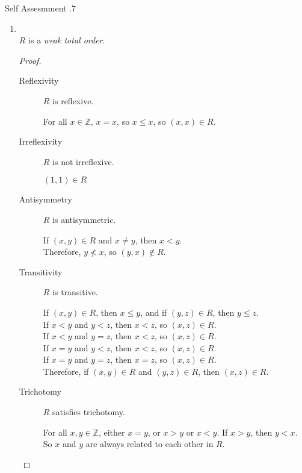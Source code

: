 \documentclass[../notes.tex]{subfiles}
\begin{document}
\begin{exercise}{Self Assesmment \thechapter.7}
\begin{enumerate}
						\item {}\\
							$R$ is a \emph{weak total order}.
							\begin{proof}
								$ $
								\begin{description}
									\item[Reflexivity] $R$ is reflexive.
										\begin{subproof}
											For all $x \in \mathbb{Z}$, $x = x$, so $x \leq x$, so $(x, x) \in R$.
										\end{subproof}
									\item[Irreflexivity] $R$ is not irreflexive.
										\begin{subproof}[Counterexample]
											$(1, 1) \in R$
										\end{subproof}
									\item[Antisymmetry] $R$ is antisymmetric.
										\begin{subproof}
											If $(x, y) \in R$ and $x \neq y$, then $x < y$.\\
											Therefore, $y \not < x$, so $(y, x) \notin R$.
										\end{subproof}
									\pagebreak
									\item[Transitivity] $R$ is transitive.
										\begin{subproof}
											If $(x, y) \in R$, then $x \leq y$, and
											if $(y, z) \in R$, then $y \leq z$.\\
											If $x < y$ and $y < z$, then $x < z$, so $(x, z) \in R$.\\
											If $x < y$ and $y = z$, then $x < z$, so $(x, z) \in R$.\\
											If $x = y$ and $y < z$, then $x < z$, so $(x, z) \in R$.\\
											If $x = y$ and $y = z$, then $x = z$, so $(x, z) \in R$.\\
											Therefore, if $(x, y) \in R$ and $(y, z) \in R$, then $(x, z) \in R$. 
										\end{subproof}
									\item[Trichotomy] $R$ satisfies trichotomy.
										\begin{subproof}
											For all $x, y \in \mathbb{Z}$, either $x = y$, or $x > y$ or $x < y$. If $x > y$, then $y < x$. So $x$ and $y$ are always related to each other in $R$.
										\end{subproof}
								\end{description}

\end{proof}
\end{enumerate}
\end{exercise}
\end{document}
